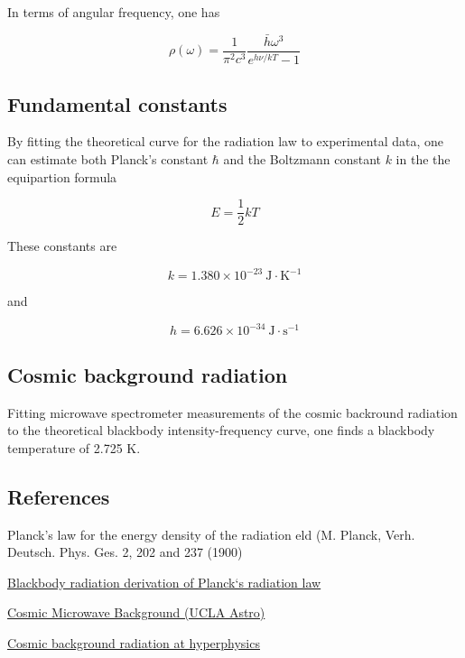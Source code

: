 In terms of angular frequency, one has

\begin{equation}
\rho(\omega) = \frac{1}{\pi^2 c^3} \frac{\bar h\omega^3}{e^{h\nu/kT} - 1}
\end{equation}



\subsection{Fundamental constants}

By fitting the theoretical curve for the radiation law to experimental data, one can estimate both Planck's constant $\hbar$ and the Boltzmann constant $k$ in the the equipartion formula

$$
E = \frac{1}{2} kT
$$

These constants are

$$ k = 1.380 \times 10^{-23}\ \text{J}\cdot\text{K}^{-1}$$

and

$$ h = 6.626 \times 10^{-34}\ \text{J}\cdot\text{s}^{-1}$$

\subsection{Cosmic background radiation}

Fitting microwave spectrometer measurements of the cosmic backround radiation to the theoretical blackbody intensity-frequency curve, one finds a blackbody temperature of 2.725 K.



\subsection{References}

Planck's law for the energy density of the radiation eld (M.
Planck, Verh. Deutsch. Phys. Ges. 2, 202 and 237 (1900)

\href{https://www.chemie.unibas.ch/~tulej/Spectroscopy_related_aspects/Lecture7_Spec_Rel_Asp.pdf}{Blackbody radiation
derivation of Planck‘s radiation law}

\href{http://www.astro.ucla.edu/~wright/CMB.html}{Cosmic Microwave Background (UCLA Astro)}

\href{http://hyperphysics.phy-astr.gsu.edu/hbase/bkg3k.html}{Cosmic background radiation at hyperphysics}
